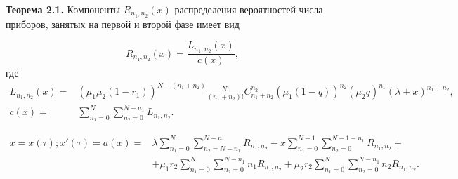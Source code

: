 \hspace*{\parindent}%
\textbf{Теорема 2.1.} Компоненты  $R_{n_{1}, n_{2}}(x)$ распределения вероятностей числа приборов, занятых на первой и второй фазе имеет вид

\begin{equation}\label{R}
		R_{n_{1}, n_{2}}(x)=\frac{L_{n_{1}, n_{2}}(x)}{c(x)},
\end{equation}
		где\\
\begin{equation*}
	\begin{aligned}
		L_{n_{1}, n_{2}}(x) =& (\mu_{1}\mu_{2}(1-r_{1}))^{N-(n_{1}+n_{2})}
		\frac{N!}{(n_{1}+n_{2})!}C_{n_{1}+n_{2}}^{n_{2}}
		(\mu_{1}(1-q))^{n_{2}}(\mu_{2}q)^{n_{1}}(\lambda+x)^{n_{1}+n_{2}},\\
		c(x)=&\sum_{n_1=0}^N\sum_{n_2=0}^{N-n_1} L_{n_{1}, n_{2}}.
	\end{aligned}
\end{equation*}

\begin{equation*}
	\begin{aligned}
		x=x(\tau);x'(\tau)=a(x)=&\lambda \sum_{n_1=0}^N\sum_{n_2=N-n_1}^{N-n_1} 
		R_{n_{1}, n_{2}}
		- x\sum_{n_1=0}^{N-1}\sum_{n_2=0}^{N-1-n_1} 
		R_{n_{1}, n_{2}}+\\
		&+\mu_1 r_2 \sum_{n_1=0}^{N}\sum_{n_2=0}^{N-n_1} 
		n_1 R_{n_{1}, n_{2}}
		+\mu_2 r_2 \sum_{n_1=0}^{N}\sum_{n_2=0}^{N-n_1} 
		n_2 R_{n_{1}, n_{2}}.
	\end{aligned}
\end{equation*}